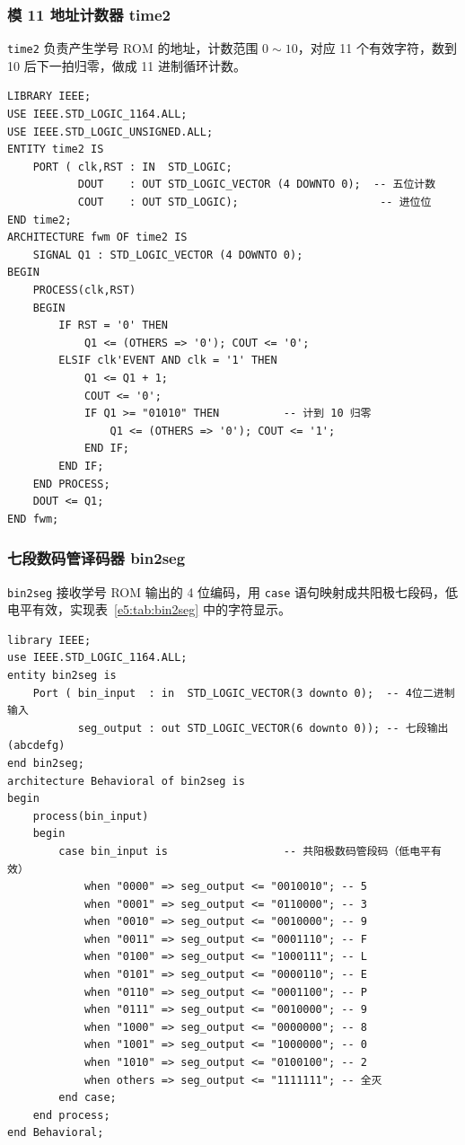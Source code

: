 \documentclass{ctexrep}
\begin{document}
\subsubsection{模 11 地址计数器 time2}

\texttt{time2} 负责产生学号 ROM 的地址，计数范围 $0\sim10$，对应 11 个有效字符，数到 10 后下一拍归零，做成 11 进制循环计数。

\begin{verbatim}
LIBRARY IEEE;
USE IEEE.STD_LOGIC_1164.ALL;
USE IEEE.STD_LOGIC_UNSIGNED.ALL;
ENTITY time2 IS
    PORT ( clk,RST : IN  STD_LOGIC;
           DOUT    : OUT STD_LOGIC_VECTOR (4 DOWNTO 0);  -- 五位计数
           COUT    : OUT STD_LOGIC);                      -- 进位位
END time2;
ARCHITECTURE fwm OF time2 IS
    SIGNAL Q1 : STD_LOGIC_VECTOR (4 DOWNTO 0);
BEGIN
    PROCESS(clk,RST)
    BEGIN
        IF RST = '0' THEN
            Q1 <= (OTHERS => '0'); COUT <= '0';
        ELSIF clk'EVENT AND clk = '1' THEN
            Q1 <= Q1 + 1;
            COUT <= '0';
            IF Q1 >= "01010" THEN          -- 计到 10 归零
                Q1 <= (OTHERS => '0'); COUT <= '1';
            END IF;
        END IF;
    END PROCESS;
    DOUT <= Q1;
END fwm;
\end{verbatim}
\label{e5:lst:time2}

\subsubsection{七段数码管译码器 bin2seg}

\texttt{bin2seg} 接收学号 ROM 输出的 4 位编码，用 \texttt{case} 语句映射成共阳极七段码，低电平有效，实现表~\ref{e5:tab:bin2seg} 中的字符显示。

\begin{verbatim}
library IEEE;
use IEEE.STD_LOGIC_1164.ALL;
entity bin2seg is
    Port ( bin_input  : in  STD_LOGIC_VECTOR(3 downto 0);  -- 4位二进制输入
           seg_output : out STD_LOGIC_VECTOR(6 downto 0)); -- 七段输出(abcdefg)
end bin2seg;
architecture Behavioral of bin2seg is
begin
    process(bin_input)
    begin
        case bin_input is                  -- 共阳极数码管段码（低电平有效）
            when "0000" => seg_output <= "0010010"; -- 5
            when "0001" => seg_output <= "0110000"; -- 3
            when "0010" => seg_output <= "0010000"; -- 9
            when "0011" => seg_output <= "0001110"; -- F
            when "0100" => seg_output <= "1000111"; -- L
            when "0101" => seg_output <= "0000110"; -- E
            when "0110" => seg_output <= "0001100"; -- P
            when "0111" => seg_output <= "0010000"; -- 9
            when "1000" => seg_output <= "0000000"; -- 8
            when "1001" => seg_output <= "1000000"; -- 0
            when "1010" => seg_output <= "0100100"; -- 2
            when others => seg_output <= "1111111"; -- 全灭
        end case;
    end process;
end Behavioral;
\end{verbatim}
\label{e5:lst:bin2seg}
\end{document}
